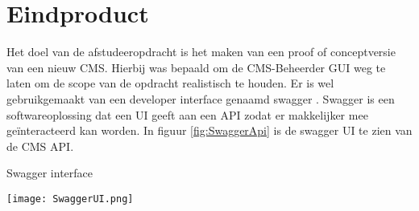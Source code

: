 \section{Eindproduct}
\label{section:Eindproduct}
Het doel van de afstudeeropdracht is het maken van een proof of conceptversie van een nieuw CMS.
Hierbij was bepaald om de CMS-\gls{Beheerder} \gls{GUI} weg te laten om de scope van de opdracht realistisch te houden.
Er is wel gebruikgemaakt van een developer interface genaamd swagger \parencite{Swagger}.
Swagger is een softwareoplossing dat een UI geeft aan een API zodat er makkelijker mee geïnteracteerd kan worden.
In figuur \ref{fig:SwaggerApi} is de swagger UI te zien van de CMS API.

\whitespace
\begin{graphic}
    \captionsetup{type=figure}
    \caption{Swagger interface}
    \texttt{[image: SwaggerUI.png]}
    \label{fig:SwaggerApi}
\end{graphic}


\newpage


